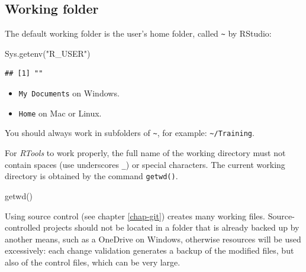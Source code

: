 \documentclass[
  12pt,
  american,
  a4paper,
  extrafontsizes,onecolumn,openright
  ]{memoir}
\newenvironment{Shaded}{\begin{snugshade}}{\end{snugshade}}
\newcommand{\FunctionTok}[1]{\textcolor[rgb]{0.00,0.00,0.00}{#1}}
\newcommand{\NormalTok}[1]{#1}
\newcommand{\StringTok}[1]{\textcolor[rgb]{0.31,0.60,0.02}{#1}}
\providecommand{\tightlist}{%
  \setlength{\itemsep}{0pt}\setlength{\parskip}{0pt}}
\begin{document}
\hypertarget{working-folder}{%
\subsection{Working folder}\label{working-folder}}

The default working folder is the user's home folder, called \texttt{\textasciitilde{}} by RStudio:

\scriptsize

\begin{Shaded}
\begin{Highlighting}[]
\FunctionTok{Sys.getenv}\NormalTok{(}\StringTok{"R\_USER"}\NormalTok{)}
\end{Highlighting}
\end{Shaded}

\begin{verbatim}
## [1] ""
\end{verbatim}

\normalsize

\begin{itemize}
\tightlist
\item
  \texttt{My\ Documents} on Windows.
\item
  \texttt{Home} on Mac or Linux.
\end{itemize}

You should always work in subfolders of \texttt{\textasciitilde{}}, for example: \texttt{\textasciitilde{}/Training}.

For \emph{RTools} to work properly, the full name of the working directory must not contain spaces (use underscores \texttt{\_}) or special characters.
The current working directory is obtained by the command \texttt{getwd()}.

\scriptsize

\begin{Shaded}
\begin{Highlighting}[]
\FunctionTok{getwd}\NormalTok{()}
\end{Highlighting}
\end{Shaded}

\normalsize

Using source control (see chapter \ref{chap-git}) creates many working files.
Source-controlled projects should not be located in a folder that is already backed up by another means, such as a OneDrive on Windows, otherwise resources will be used excessively: each change validation generates a backup of the modified files, but also of the control files, which can be very large.
\end{document}
